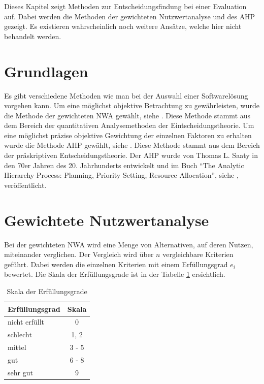   Dieses Kapitel zeigt Methoden zur Entscheidungsfindung bei einer Evaluation
  auf. Dabei werden die Methoden der gewichteten Nutzwertanalyse und des
  \ac{AHP} gezeigt. Es existieren wahrscheinlich noch weitere Ansätze, welche
  hier nicht behandelt werden.
  
  \section{Grundlagen}
  
  Es gibt verschiedene Methoden wie man bei der Auswahl einer Softwarelösung
  vorgehen kann. Um eine möglichst objektive Betrachtung zu gewährleisten, wurde
  die Methode der gewichteten \ac{NWA} gewählt, siehe \cite{Nutzwertanalyse}.
  Diese Methode stammt aus dem Bereich der quantitativen Analysemethoden der
  Eintscheidungstheorie. Um eine möglichst präzise objektive Gewichtung der
  einzelnen Faktoren zu erhalten wurde die Methode \ac{AHP} gewählt, siehe
  \cite{AnalyticHierarchyProcess}. Diese Methode stammt aus dem Bereich der
  präskriptiven Entscheidungstheorie. Der \ac{AHP} wurde von Thomas L. Saaty in
  den 70er Jahren des 20. Jahrhunderts entwickelt und im Buch ``The Analytic
  Hierarchy Process: Planning, Priority Setting, Resource
  Allocation'', siehe \cite{AnalyticHierarchyProcessBook}, veröffentlicht.
  
  \section{Gewichtete Nutzwertanalyse}
  
  Bei der gewichteten \ac{NWA} wird eine Menge von Alternativen, auf deren
  Nutzen, miteinander verglichen. Der Vergleich wird über \(n\) vergleichbare
  Kriterien geführt. Dabei werden die einzelnen Kriterien mit einem
  Erfüllungsgrad \(e_i\) bewertet. Die Skala der Erfüllungsgrade ist in der
  Tabelle \ref{tab:erfuellungsgrade} ersichtlich.
  
  \begin{table}[ht]
    \sffamily 
    \begin{center}
      \begin{tabular}{lc}
        \toprule
        Erfüllungsgrad & Skala\\
        \midrule
        nicht erfüllt & 0\\
        schlecht & 1, 2\\
        mittel & 3 - 5\\
        gut & 6 - 8\\
        sehr gut & 9\\
        \bottomrule
      \end{tabular}
      \caption{Skala der Erfüllungsgrade}
      \label{tab:erfuellungsgrade}
    \end{center}
  \end{table}
  

